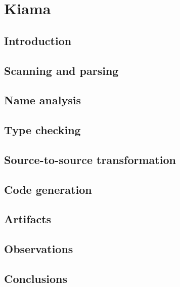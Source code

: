 \section{Kiama}

\subsection{Introduction}

\subsection{Scanning and parsing}

\subsection{Name analysis}

\subsection{Type checking}

\subsection{Source-to-source transformation}

\subsection{Code generation}

\subsection{Artifacts}

\subsection{Observations}

\subsection{Conclusions}

